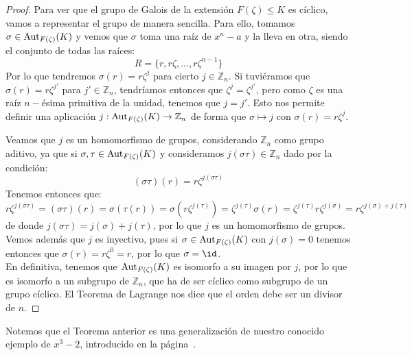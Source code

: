 \begin{teo}
\begin{proof}
        \noindent
        Para ver que el grupo de Galois de la extensión $F(\zeta)\leq K$ es cíclico, vamos a representar el grupo de manera sencilla. Para ello, tomamos $\sigma\in \operatorname{Aut}_{F(\zeta)}(K)$ y vemos que $\sigma$ toma una raíz de $x^n-a$ y la lleva en otra, siendo el conjunto de todas las raíces:
        \begin{equation*}
            R = \{r, r\zeta, \ldots, r\zeta^{n-1}\}
        \end{equation*}
        Por lo que tendremos $\sigma(r) =  r\zeta^j$ para cierto $j\in \mathbb{Z}_n$. Si tuviéramos que $\sigma(r) = r\zeta^{j'}$ para $j'\in \mathbb{Z}_n$, tendríamos entonces que $\zeta^j = \zeta^{j'}$, pero como $\zeta$ es una raíz $n-$ésima primitiva de la unidad, tenemos que $j=j'$. Esto nos permite definir una aplicación $j:\operatorname{Aut}_{F(\zeta)}(K)\to \mathbb{Z}_n$ de forma que $\sigma\mapsto j$ con $\sigma(r) = r\zeta^j$.

        \noindent
        Veamos que $j$ es un homomorfismo de grupos, considerando $\mathbb{Z}_n$ como grupo aditivo, ya que si $\sigma,\tau \in \operatorname{Aut}_{F(\zeta)}(K)$ y consideramos $j(\sigma\tau)\in \mathbb{Z}_n$ dado por la condición:
        \begin{equation*}
            (\sigma\tau)(r) = r\zeta^{j(\sigma\tau)}
        \end{equation*}
        Tenemos entonces que:
        \begin{equation*}
            r\zeta^{j(\sigma\tau)} = (\sigma\tau)(r) = \sigma(\tau(r)) = \sigma(r\zeta^{j(\tau)}) = \zeta^{j(\tau)} \sigma(r) = \zeta^{j(\tau)}r\zeta^{j(\sigma)} = r\zeta^{j(\sigma)+j(\tau)}
        \end{equation*}
        de donde $j(\sigma\tau) = j(\sigma)+j(\tau)$, por lo que $j$ es un homomorfismo de grupos. Vemos además que $j$ es inyectivo, pues si $\sigma \in \operatorname{Aut}_{F(\zeta)}(K)$ con $j(\sigma) = 0$ tenemos entonces que $\sigma(r) = r\zeta^0 = r$, por lo que $\sigma = \id$.\\

        \noindent
        En definitiva, tenemos que $\operatorname{Aut}_{F(\zeta)}(K)$ es isomorfo a su imagen por $j$, por lo que es isomorfo a un subgrupo de $\mathbb{Z}_n$, que ha de ser cíclico como subgrupo de un grupo cíclico. El Teorema de Lagrange nos dice que el orden debe ser un divisor de $n$.
    \end{proof}
\end{teo}

Notemos que el Teorema anterior es una generalización de nuestro conocido ejemplo de $x^3-2$, introducido en la página~\pageref{ej:x3menos2CuerpoDescomposicion}.\\

